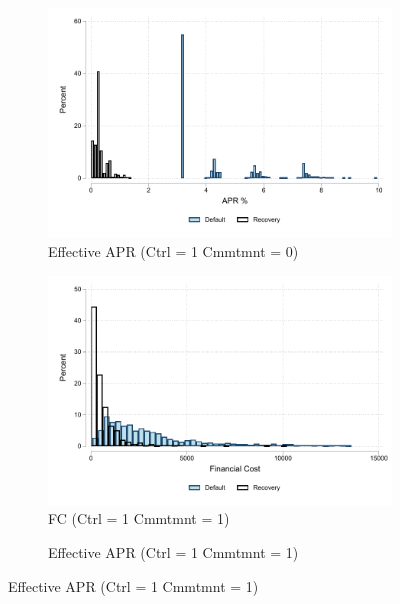 \documentclass[oneside,11pt]{article}
\begin{document}
\begin{figure}[H]
\begin{center}
\begin{subfigure}{.45\textwidth}
    \end{subfigure}
     \begin{subfigure}{0.45\textwidth}
    \caption{Effective APR (Ctrl = 1 Cmmtmnt = 0)}
       \centering
      \includegraphics[width=\textwidth]{Figuras/hist_apr_1_0.pdf}
    \end{subfigure}
   \begin{subfigure}{.45\textwidth}
      \caption{FC (Ctrl = 1 Cmmtmnt = 1)}
        \centering
        \includegraphics[width=\textwidth]{Figuras/hist_fc_1_1.pdf}
    \end{subfigure}
     \begin{subfigure}{0.45\textwidth}
    \caption{Effective APR (Ctrl = 1 Cmmtmnt = 1)}
       \centering

\end{subfigure}
\end{center}
\end{figure}
\end{document}
